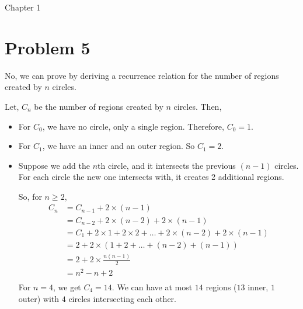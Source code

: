 \begin{center}
    {\huge Chapter 1}
\end{center}
\section*{Problem 5}
No, we can prove by deriving a recurrence relation for the number of regions created by $n$ circles.

Let, $C_n$ be the number of regions created by $n$ circles. Then,
\begin{itemize}
    \item For $C_0$, we have no circle, only a single region. Therefore, $C_0 = 1$.
    \item For $C_1$, we have an inner and an outer region. So $C_1 = 2$.
    \item Suppose we add the $n$th circle, and it intersects the previous $(n-1)$ circles. For each circle the new one intersects with, it creates 2 additional regions.
          \begin{figure}[h!]
              \centering
          \end{figure}

          So, for $n \geq 2$,
          \begin{align*}
              C_n & = C_{n-1} + 2\times(n-1)                                             \\
                  & = C_{n-2} + 2\times(n-2) + 2\times(n-1)                              \\
                  & = C_{1} + 2\times1 + 2\times2 + \ldots + 2\times(n-2) + 2\times(n-1) \\
                  & = 2 + 2\times(1+2+\ldots+(n-2)+(n-1))                                \\
                  & = 2+2\times\frac{n(n-1)}{2}                                          \\
                  & = n^2-n+2                                                            \\
          \end{align*}
          For $n=4$, we get $C_4=14$. We can have at most $14$ regions ($13$ inner, $1$ outer) with $4$ circles intersecting each other.
          \begin{figure}[h!]
              \centering
          \end{figure}
\end{itemize}
\clearpage
